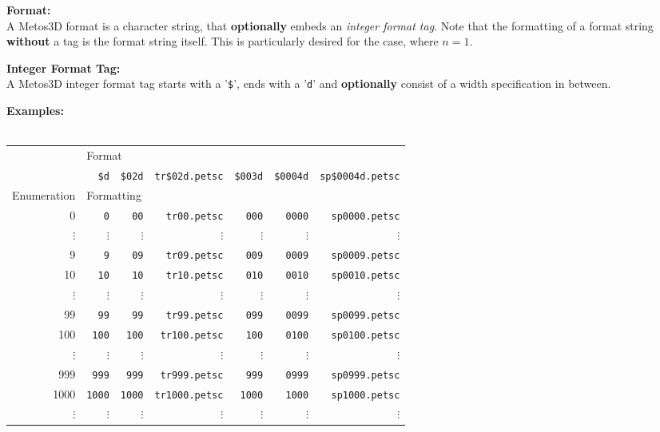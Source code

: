 \documentclass{article}
\begin{document}
\bigskip

\textbf{Format:} \\
A Metos3D format is a character string, that \textbf{optionally} embeds an \emph{integer format tag}.
Note that the formatting of a format string \textbf{without} a tag is the format string
itself. This is particularly desired for the case, where $ n = 1 $.

\bigskip

\textbf{Integer Format Tag:} \\
A Metos3D integer format tag starts with a '\texttt{\$}', ends with a '\texttt{d}'
and \textbf{optionally} consist of a width specification in between.

\bigskip

\textbf{Examples:} \\
\\
\begin{tabular}{r|r|r|r|r|r|r}
			& \multicolumn{6}{l}{Format}																												\\ \cline{2-7}
			& \texttt{\$d}			& \texttt{\$02d}		& \texttt{tr\$02d.petsc}	& \texttt{\$003d}	& \texttt{\$0004d}	& \texttt{sp\$0004d.petsc}	\\ \hline
Enumeration	& \multicolumn{6}{l}{Formatting}																											\\ \hline
0			& \texttt{0}				& \texttt{00}		& \texttt{tr00.petsc}	& \texttt{000}		& \texttt{0000}		& \texttt{sp0000.petsc}		\\
$\vdots$		& $\vdots$				& $\vdots$			& $\vdots$				& $\vdots$			& $\vdots$			& $\vdots$					\\
9			& \texttt{9}				& \texttt{09}		& \texttt{tr09.petsc}	& \texttt{009}		& \texttt{0009}		& \texttt{sp0009.petsc}		\\
10			& \texttt{10}			& \texttt{10}		& \texttt{tr10.petsc}	& \texttt{010}		& \texttt{0010}		& \texttt{sp0010.petsc}		\\
$\vdots$		& $\vdots$				& $\vdots$			& $\vdots$				& $\vdots$			& $\vdots$			& $\vdots$					\\
99			& \texttt{99}			& \texttt{99}		& \texttt{tr99.petsc}	& \texttt{099}		& \texttt{0099}		& \texttt{sp0099.petsc}		\\
100			& \texttt{100}			& \texttt{100}		& \texttt{tr100.petsc}	& \texttt{100}		& \texttt{0100}		& \texttt{sp0100.petsc}		\\
$\vdots$		& $\vdots$				& $\vdots$			& $\vdots$				& $\vdots$			& $\vdots$			& $\vdots$					\\
999			& \texttt{999}			& \texttt{999}		& \texttt{tr999.petsc}	& \texttt{999}		& \texttt{0999}		& \texttt{sp0999.petsc}		\\
1000			& \texttt{1000}			& \texttt{1000}		& \texttt{tr1000.petsc}	& \texttt{1000}		& \texttt{1000}		& \texttt{sp1000.petsc}		\\
$\vdots$		& $\vdots$				& $\vdots$			& $\vdots$				& $\vdots$			& $\vdots$			& $\vdots$					
\end{tabular}
\end{document}
